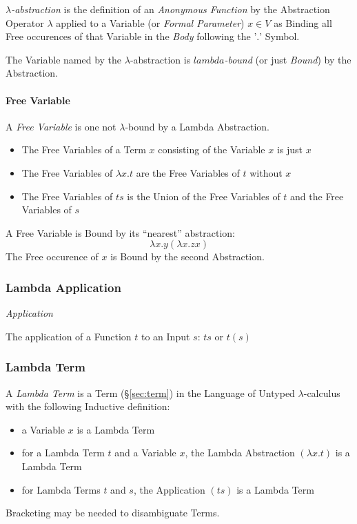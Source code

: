 \emph{$\lambda$-abstraction} is the definition of an \emph{Anonymous
  Function} by the Abstraction Operator $\lambda$ applied to a
Variable (or \emph{Formal Parameter}) $x \in V$ as Binding all Free
occurences of that Variable in the \emph{Body} following the '$.$'
Symbol.

The Variable named by the $\lambda$-abstraction is
\emph{$lambda$-bound} (or just \emph{Bound}) by the Abstraction.



\paragraph{Free Variable}\label{sec:free_variable}\hfill

A \emph{Free Variable} is one not $\lambda$-bound by a Lambda
Abstraction.

\begin{itemize}
  \item The Free Variables of a Term $x$ consisting of the Variable
    $x$ is just $x$
  \item The Free Variables of $\lambda x.t$ are the Free Variables of
    $t$ without $x$
  \item The Free Variables of $ts$ is the Union of the Free Variables
    of $t$ and the Free Variables of $s$
\end{itemize}

A Free Variable is Bound by its ``nearest'' abstraction:
\[
  \lambda x.y (\lambda x.z x)
\]
The Free occurence of $x$ is Bound by the second Abstraction.



\subsubsection{Lambda Application}\label{sec:lambda_application}

\emph{Application}

The application of a Function $t$ to an Input $s$: $ts$ or $t(s)$



\subsubsection{Lambda Term}\label{sec:lambda_term}

A \emph{Lambda Term} is a Term (\S\ref{sec:term}) in the Language of
Untyped $\lambda$-calculus with the following Inductive definition:
\begin{itemize}
  \item a Variable $x$ is a Lambda Term
  \item for a Lambda Term $t$ and a Variable $x$, the Lambda
    Abstraction $(\lambda x.t)$ is a Lambda Term
  \item for Lambda Terms $t$ and $s$, the Application $(ts)$ is a
    Lambda Term
\end{itemize}
Bracketing may be needed to disambiguate Terms.

